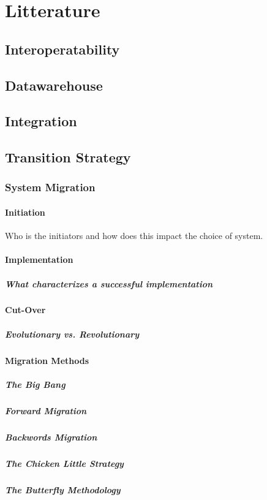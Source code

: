 \part{Litterature}
\chapter{Interoperatability}
\chapter{Datawarehouse}
\chapter{Integration}
\chapter{Transition Strategy}
\section{System Migration \cite{2} \cite{8}}
\subsection{Initiation}
Who is the initiators and how does this impact the choice of system.
\subsection{Implementation}
\subsubsection{What characterizes a successful implementation}
\subsection{Cut-Over}
\subsubsection{Evolutionary vs. Revolutionary}
\subsection{Migration Methods}
\subsubsection{The Big Bang}
\subsubsection{Forward Migration}
\subsubsection{Backwords Migration}
\subsubsection{The Chicken Little Strategy}
\subsubsection{The Butterfly Methodology}
